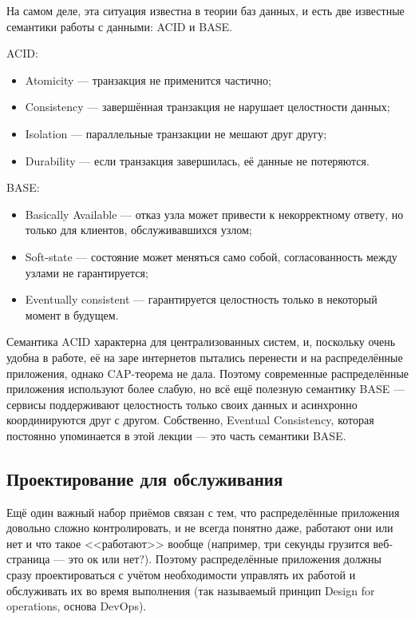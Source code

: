 \documentclass[a5paper]{article}
\begin{document}
На самом деле, эта ситуация известна в теории баз данных, и есть две известные семантики работы с данными: ACID и BASE.

ACID:
\begin{itemize}
    \item Atomicity --- транзакция не применится частично;
    \item Consistency --- завершённая транзакция не нарушает целостности данных;
    \item Isolation --- параллельные транзакции не мешают друг другу;
    \item Durability --- если транзакция завершилась, её данные не потеряются.
\end{itemize}

BASE:
\begin{itemize}
    \item Basically Available --- отказ узла может привести к некорректному ответу, но только для клиентов, обслуживавшихся узлом;
    \item Soft-state --- состояние может меняться само собой, согласованность между узлами не гарантируется;
    \item Eventually consistent --- гарантируется целостность только в некоторый момент в будущем.
\end{itemize}

Семантика ACID характерна для централизованных систем, и, поскольку очень удобна в работе, её на заре интернетов пытались перенести и на распределённые приложения, однако CAP-теорема не дала. Поэтому современные распределённые приложения используют более слабую, но всё ещё полезную семантику BASE --- сервисы поддерживают целостность только своих данных и асинхронно координируются друг с другом. Собственно, Eventual Consistency, которая постоянно упоминается в этой лекции --- это часть семантики BASE.

\subsection{Проектирование для обслуживания}

Ещё один важный набор приёмов связан с тем, что распределённые приложения довольно сложно контролировать, и не всегда понятно даже, работают они или нет и что такое <<работают>> вообще (например, три секунды грузится веб-страница --- это ок или нет?). Поэтому распределённые приложения должны сразу проектироваться с учётом необходимости управлять их работой и обслуживать их во время выполнения (так называемый принцип Design for operations, основа DevOps).
\end{document}
